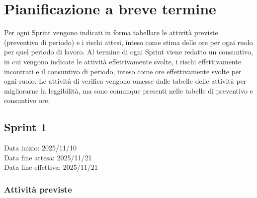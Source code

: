\documentclass[a4paper,12pt]{article}
\begin{document}
\begin{table}[H]
\end{table}


\section{Pianificazione a breve termine}

Per ogni Sprint vengono indicati in forma tabellare le attività previste (preventivo di periodo) e i rischi attesi, inteso come stima delle ore per ogni ruolo per quel periodo di lavoro. Al termine di ogni Sprint viene redatto un consuntivo, in cui vengono indicate le attività effettivamente svolte, i rischi effettivamente incontrati e il consuntivo di periodo, inteso come ore effettivamente svolte per ogni ruolo.
Le attività di verifica vengono omesse dalle tabelle delle attività per migliorarne la leggibilità, ma sono comunque presenti nelle tabelle di preventivo e consuntivo ore.

\subsection{Sprint 1}
Data inizio: 2025/11/10\\
Data fine attesa: 2025/11/21\\
Data fine effettiva: 2025/11/21

\setlength{\LTleft}{-0,4cm}

\setlength{\LTleft}{-0,4cm}

\subsubsection{Attività previste}
\end{document}
